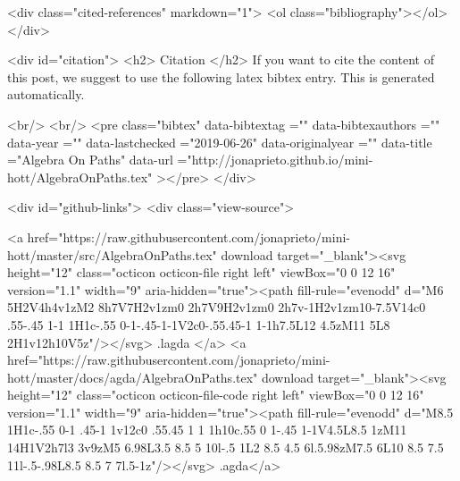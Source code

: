   <div class="cited-references" markdown="1">
  <ol class="bibliography"></ol>
  </div>


  
  <div id="citation">
  <h2> Citation </h2>
  If you want to cite the content of this post,
  we suggest to use the following latex bibtex entry.
  This is generated automatically.

  <br/>
  <br/>
  <pre class="bibtex"
       data-bibtextag =""
       data-bibtexauthors =""
       data-year =""
       data-lastchecked ="2019-06-26"
       data-originalyear =""
       data-title ="Algebra On Paths"
       data-url ="http://jonaprieto.github.io/mini-hott/AlgebraOnPaths.tex"
  ></pre>
  </div>
  

  <div id="github-links">
    <div class="view-source">
      
        <a href="https://raw.githubusercontent.com/jonaprieto/mini-hott/master/src/AlgebraOnPaths.tex" download target="_blank"><svg height="12" class="octicon octicon-file right left" viewBox="0 0 12 16" version="1.1" width="9" aria-hidden="true"><path fill-rule="evenodd" d="M6 5H2V4h4v1zM2 8h7V7H2v1zm0 2h7V9H2v1zm0 2h7v-1H2v1zm10-7.5V14c0 .55-.45 1-1 1H1c-.55 0-1-.45-1-1V2c0-.55.45-1 1-1h7.5L12 4.5zM11 5L8 2H1v12h10V5z"/></svg> .lagda </a>
        <a href="https://raw.githubusercontent.com/jonaprieto/mini-hott/master/docs/agda/AlgebraOnPaths.tex" download target="_blank"><svg height="12" class="octicon octicon-file-code right left" viewBox="0 0 12 16" version="1.1" width="9" aria-hidden="true"><path fill-rule="evenodd" d="M8.5 1H1c-.55 0-1 .45-1 1v12c0 .55.45 1 1 1h10c.55 0 1-.45 1-1V4.5L8.5 1zM11 14H1V2h7l3 3v9zM5 6.98L3.5 8.5 5 10l-.5 1L2 8.5 4.5 6l.5.98zM7.5 6L10 8.5 7.5 11l-.5-.98L8.5 8.5 7 7l.5-1z"/></svg> .agda</a>
      
